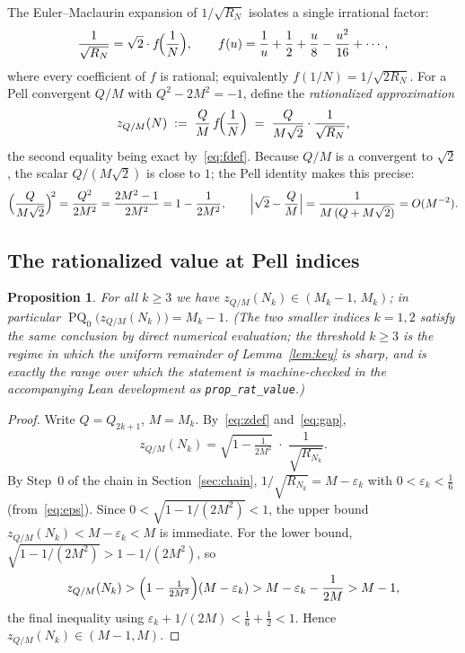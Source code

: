 \documentclass[12pt]{amsart}
\newtheorem{proposition}[theorem]{Proposition}
\theoremstyle{definition}
\DeclareMathOperator{\PQ}{PQ}
\begin{document}
The Euler--Maclaurin expansion of $1/\sqrt{R_N}$ isolates a single
irrational factor:
\begin{equation}\label{eq:fdef}
  \frac{1}{\sqrt{R_N}} = \sqrt{2}\cdot f\!\Bigl(\frac{1}{N}\Bigr),
  \qquad
  f(u) = \frac{1}{u} + \frac{1}{2} + \frac{u}{8} - \frac{u^2}{16}
         + \cdots,
\end{equation}
where every coefficient of $f$ is rational; equivalently
$f(1/N) = 1/\sqrt{2R_N}$.  For a Pell convergent $Q/M$ with
$Q^2 - 2M^2 = -1$, define the \emph{rationalized approximation}
\begin{equation}\label{eq:zdef}
  z_{Q/M}(N) \;:=\; \frac{Q}{M}\, f\!\Bigl(\frac{1}{N}\Bigr)
             \;=\; \frac{Q}{M\sqrt{2}}\cdot\frac{1}{\sqrt{R_N}},
\end{equation}
the second equality being exact by~\eqref{eq:fdef}.  Because $Q/M$ is a
convergent to $\sqrt{2}$, the scalar $Q/(M\sqrt{2})$ is close to $1$; the
Pell identity makes this precise:
\begin{equation}\label{eq:gap}
  \Bigl(\frac{Q}{M\sqrt{2}}\Bigr)^{\!2}
  = \frac{Q^2}{2M^2} = \frac{2M^2-1}{2M^2} = 1 - \frac{1}{2M^2},
  \qquad
  \Bigl|\sqrt{2}-\frac{Q}{M}\Bigr| = \frac{1}{M\,(Q+M\sqrt{2})} = O(M^{-2}).
\end{equation}

\subsection{The rationalized value at Pell indices}

\begin{proposition}\label{prop:rat-value}
  For all $k \geq 3$ we have $z_{Q/M}(N_k) \in (M_k-1,\, M_k)$; in
  particular $\PQ_0\bigl(z_{Q/M}(N_k)\bigr) = M_k - 1$.  (The two smaller
  indices $k = 1, 2$ satisfy the same conclusion by direct numerical
  evaluation; the threshold $k \ge 3$ is the regime in which the uniform
  remainder of Lemma~\ref{lem:key} is sharp, and is exactly the range over
  which the statement is machine-checked in the accompanying Lean
  development as \texttt{prop\_rat\_value}.)
\end{proposition}

\begin{proof}
  Write $Q = Q_{2k+1}$, $M = M_k$.  By~\eqref{eq:zdef} and~\eqref{eq:gap},
  \[
    z_{Q/M}(N_k) = \sqrt{1-\tfrac{1}{2M^2}}\;\cdot\;\frac{1}{\sqrt{R_{N_k}}}.
  \]
  By Step~0 of the chain in Section~\ref{sec:chain}, $1/\sqrt{R_{N_k}}
  = M - \varepsilon_k$ with $0 < \varepsilon_k < \tfrac16$
  (from~\eqref{eq:eps}).  Since $0 < \sqrt{1-1/(2M^2)} < 1$, the upper
  bound $z_{Q/M}(N_k) < M-\varepsilon_k < M$ is immediate.  For the lower
  bound, $\sqrt{1-1/(2M^2)} > 1 - 1/(2M^2)$, so
  \[
    z_{Q/M}(N_k) > \Bigl(1-\tfrac{1}{2M^2}\Bigr)(M-\varepsilon_k)
    > M - \varepsilon_k - \frac{1}{2M} > M-1,
  \]
  the final inequality using $\varepsilon_k + 1/(2M) < \tfrac16 + \tfrac12 < 1$.
  Hence $z_{Q/M}(N_k) \in (M-1, M)$.
\end{proof}
\end{document}
